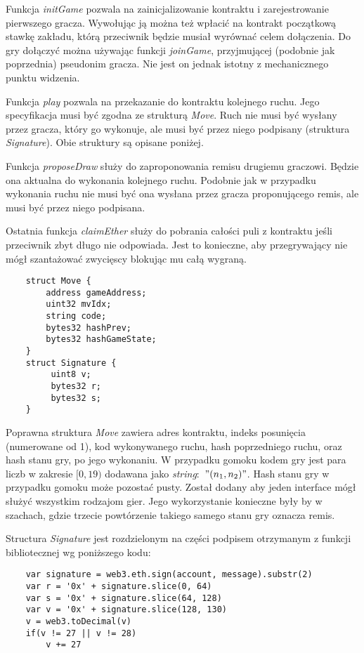 \documentclass[a4paper, 12pt, onecolumn, one]{article}
\begin{document}
	Funkcja \textit{initGame} pozwala na zainicjalizowanie kontraktu i zarejestrowanie pierwszego gracza. Wywołując ją można też wpłacić na kontrakt początkową stawkę zakładu, którą przeciwnik będzie musiał wyrównać celem dołączenia. Do gry dołączyć można używając funkcji \textit{joinGame}, przyjmującej (podobnie jak poprzednia) pseudonim gracza. Nie jest on jednak istotny z mechanicznego punktu widzenia.
	
	Funkcja \textit{play} pozwala na przekazanie do kontraktu kolejnego ruchu. Jego specyfikacja musi być zgodna ze strukturą \textit{Move}. Ruch nie musi być wysłany przez gracza, który go wykonuje, ale musi być przez niego podpisany (struktura \textit{Signature}). Obie struktury są opisane poniżej.
	
	Funkcja \textit{proposeDraw} służy do zaproponowania remisu drugiemu graczowi. Będzie ona aktualna do wykonania kolejnego ruchu. Podobnie jak w przypadku wykonania ruchu nie musi być ona wysłana przez gracza proponującego remis, ale musi być przez niego podpisana.
	
	Ostatnia funkcja \textit{claimEther} służy do pobrania całości puli z kontraktu jeśli przeciwnik zbyt długo nie odpowiada. Jest to konieczne, aby przegrywający nie mógł szantażować zwycięscy blokując mu całą wygraną.
	\\
	
	\begin{lstlisting}
    struct Move {
        address gameAddress;
        uint32 mvIdx;
        string code;
        bytes32 hashPrev;
        bytes32 hashGameState;
    }
    struct Signature {
         uint8 v;
         bytes32 r;
         bytes32 s;
    }
	\end{lstlisting}
	
	Poprawna struktura \textit{Move} zawiera adres kontraktu, indeks posunięcia (numerowane od 1), kod wykonywanego ruchu, hash poprzedniego ruchu, oraz hash stanu gry, po jego wykonaniu. W przypadku gomoku kodem gry jest para liczb w zakresie $[0,19)$ dodawana jako \textit{string}:~$"(n_1,n_2)"$. Hash stanu gry w przypadku gomoku może pozostać pusty. Został dodany aby jeden interface mógł służyć wszystkim rodzajom gier. Jego wykorzystanie konieczne były by w szachach, gdzie trzecie powtórzenie takiego samego stanu gry oznacza remis.
	
	Structura \textit{Signature} jest rozdzielonym na części podpisem otrzymanym z funkcji bibliotecznej wg poniższego kodu:
	
	\begin{lstlisting}
    var signature = web3.eth.sign(account, message).substr(2)
    var r = '0x' + signature.slice(0, 64)
    var s = '0x' + signature.slice(64, 128)
    var v = '0x' + signature.slice(128, 130)
    v = web3.toDecimal(v)
    if(v != 27 || v != 28)
        v += 27
	\end{lstlisting}
	
\end{document}
